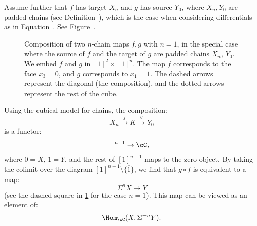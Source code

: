 Assume further that $f$ has target $X_n$ and $g$ has source $Y_0$, where $X_n, Y_0$ are padded chains (see Definition~), which is the case when considering differentials as in Equation~. See Figure~.

\begin{figure}
    \centering
    \caption{Composition of two $n$-chain maps $f, g$ with $n = 1$, in the special case where the source of $f$ and the target of $g$ are padded chains $X_n$, $Y_0$. We embed $f$ and $g$ in $[1]^2 \times [1]^n$. The map $f$ corresponds to the face $x_3 = 0$, and $g$ corresponds to $x_1 = 1$. The dashed arrows represent the diagonal (the composition), and the dotted arrows represent the rest of the cube.}
    \label{fig:comp_of_chains}
\end{figure}

\begin{obs}
Using the cubical model for chains, the composition:
\begin{equation*}
    X_n \xrightarrow{f} K \xrightarrow{g} Y_0
\end{equation*}
is a functor:
\begin{equation*}
    [1]^{n + 1} \to \cC,
\end{equation*}
where $\overline{0} = X$, $\overline{1} = Y$, and the rest of $[1]^{n + 1}$ maps to the zero object. By taking the colimit over the diagram $[1]^{n + 1} \setminus \{ \overline{1} \}$, we find that $g \circ f$ is equivalent to a map:
\begin{equation*}
    \Sigma^n X \to Y
\end{equation*}
(see the dashed square in \cref{fig:comp_of_chains} for the case $n = 1$). This map can be viewed as an element of:
\begin{equation*}
    \Hom_{\cC}(X, \Sigma^{-n} Y).
\end{equation*}
\end{obs}

